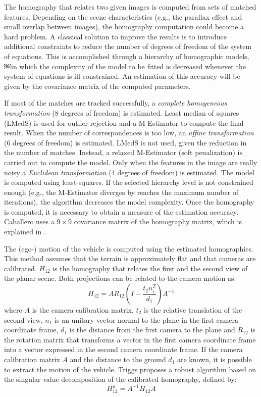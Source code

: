 The homography that relates two given images is computed from sets of matched features.
Depending on the scene characteristics (e.g., the parallax effect and small overlap between images), the homography computation could become a hard problem. 
A classical solution to improve the results is to introduce additional constraints to reduce the number of degrees of freedom of the system of equations.
This is accomplished through a hierarchy of homographic models, ￼in which the complexity of the model to be fitted is decreased whenever the system of equations is ill-constrained.
An estimation of this accuracy will be given by the covariance matrix of the computed parameters.

If most of the matches are tracked successfully, a \textit{complete homogeneous transformation} (8 degrees of freedom) is estimated.
Least median of squares (LMedS) is used for outlier rejection and a M-Estimator  \cite{zhang1997parameter} to compute the final result.
When the number of correspondences is too low, an \textit{affine transformation} (6 degrees of freedom) is estimated.
LMedS is not used, given the reduction in the number of matches.
Instead, a relaxed M-Estimator (soft penalization) is carried out to compute the model.
Only when the features in the image are really noisy a \textit{Euclidean transformation} (4 degrees of freedom) is estimated.
The model is computed using least-squares.
If the selected hierarchy level is not constrained enough (e.g., the M-Estimator diverges by reaches the maximum number of iterations), the algorithm decreases the model complexity.
Once the homography is computed, it is necessary to obtain a measure of the estimation accuracy.
Caballero uses a $9 \times 9$ covariance matrix of the homography matrix, which is explained in \cite{hartley2000multiple}.

The (ego-) motion of the vehicle is computed using the estimated homographies.
This method assumes that the terrain is approximately flat and that cameras are calibrated.
$H_{12}$ is the homography that relates the first and the second view of the planar scene.
Both projections can be related to the camera motion as:
\begin{equation}
H_{12} = AR_{12}(I - \frac{t_2n_i^T}{d_1})A^{-1}
\end{equation}
where $A$ is the camera calibration matrix, $t_2$ is the relative translation of the second view, $n_1$ is an unitary vector normal to the plane in the first camera coordinate frame, $d_1$ is the distance from the first camera to the plane and $R_{12}$ is the rotation matrix that transforms a vector in the first camera coordinate frame into a vector expressed in the second camera coordinate frame.
If the camera calibration matrix $A$ and the distance to the ground $d_1$ are known, it is possible to extract the motion of the vehicle.
Triggs \cite{triggs1998autocalibration} proposes a robust algorithm based on the singular value decomposition of the calibrated homography, defined by:
\begin{equation}
H_{12}^{u} = A^{-1} H_{12} A
\end{equation}


